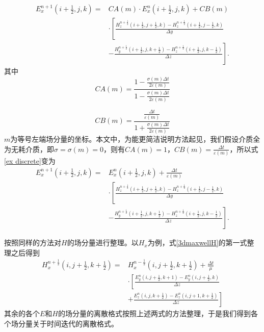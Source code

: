 \begin{equation}\label{ch2 eq:ex discrete}
\begin{split}
E^{n+1}_{x}\left( i+\frac{1}{2},j,k \right)=&CA(m) \cdot E^{n}_{x}\left( i+\frac{1}{2},j,k \right)+CB(m)\\
{}&\cdot\left[
\frac{H^{n+\frac{1}{2}}_{z}\left(i+\frac{1}{2},j+\frac{1}{2},k\right)-H^{n+\frac{1}{2}}_{z}\left(i+\frac{1}{2},j-\frac{1}{2},k\right)}{\Delta y}\right.\\
{}&-
\left.\frac{H^{n+\frac{1}{2}}_{y}\left(i+\frac{1}{2},j,k+\frac{1}{2}\right)-H^{n+\frac{1}{2}}_{z}\left(i+\frac{1}{2},j,k-\frac{1}{2}\right)}{\Delta z}
\right].
\end{split}
\end{equation}
其中
\begin{equation}
CA(m)=\frac{
	1-\frac{\sigma(m)\Delta t}{2\varepsilon(m)}
	}{
	1-\frac{\sigma(m)\Delta t}{2\varepsilon(m)}	
	}
\end{equation}

\begin{equation}
CB(m)=\frac{
	\frac{\Delta t}{\varepsilon(m)}
}{
1+\frac{\sigma(m)\Delta t}{2\varepsilon(m)}	
}	
\end{equation}\label{ch2 eq:ex discrete simple}
$m$为等号左端场分量的坐标。本文中，为能更简洁说明方法起见，我们假设介质全为无耗介质，即$\sigma=\sigma(m)=0$，则有$CA(m)=1$，$CB(m)=\frac{\Delta t}{\varepsilon(m)}$，所以式\eqref{ex discrete}变为
\begin{equation}
\begin{split}
E^{n+1}_{x}\left( i+\frac{1}{2},j,k \right)=&E^{n}_{x}\left( i+\frac{1}{2},j,k \right)+\frac{\Delta t}{\varepsilon(m)}\\
{}&\cdot\left[
\frac{H^{n+\frac{1}{2}}_{z}\left(i+\frac{1}{2},j+\frac{1}{2},k\right)-H^{n+\frac{1}{2}}_{z}\left(i+\frac{1}{2},j-\frac{1}{2},k\right)}{\Delta y}\right.\\
{}&-
\left.\frac{H^{n+\frac{1}{2}}_{y}\left(i+\frac{1}{2},j,k+\frac{1}{2}\right)-H^{n+\frac{1}{2}}_{z}\left(i+\frac{1}{2},j,k-\frac{1}{2}\right)}{\Delta z}
\right].
\end{split}
\end{equation}

按照同样的方法对$\mathbf{\mathit{H}}$的场分量进行整理。以$H_x$为例，式\eqref{3dmaxwellH}的第一式整理之后得到
\begin{equation}\label{ch2 eq:hx discrete simple}
\begin{split}
H^{n+\frac{1}{2}}_{x}\left( i,j+\frac{1}{2},k+\frac{1}{2} \right)=&H^{n-\frac{1}{2}}_{x}\left( i,j+\frac{1}{2},k+\frac{1}{2} \right)+\frac{\Delta t}{\mu}\\
{}&\cdot\left[
\frac{
	E^n_y\left(i,j+\frac{1}{2},k+1\right)-E^n_y\left(i,j+\frac{1}{2},k\right)
	}{\Delta z}\right.\\
{}&+\left.
\frac{
	E^n_z\left(i,j,k+\frac{1}{2}\right)-E^n_z\left(i,j+1,k+\frac{1}{2}\right)
}{\Delta z}
\right]
\end{split}
\end{equation}
其余的各个$\mathbf{\mathit{E}}$和$\mathbf{\mathit{H}}$的场分量的离散格式按照上述两式的方法整理，于是我们得到各个场分量关于时间迭代的离散格式。

